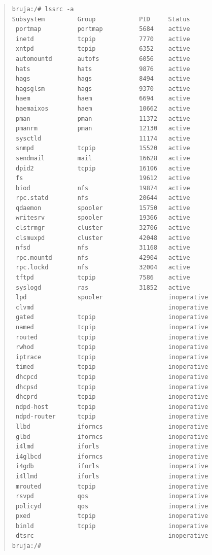 \begin{quote}
\begin{verbatim}
bruja:/# lssrc -a
Subsystem         Group            PID     Status 
 portmap          portmap          5684    active
 inetd            tcpip            7770    active
 xntpd            tcpip            6352    active
 automountd       autofs           6056    active
 hats             hats             9876    active
 hags             hags             8494    active
 hagsglsm         hags             9370    active
 haem             haem             6694    active
 haemaixos        haem             10662   active
 pman             pman             11372   active
 pmanrm           pman             12130   active
 sysctld                           11174   active
 snmpd            tcpip            15520   active
 sendmail         mail             16628   active
 dpid2            tcpip            16106   active
 fs                                19612   active
 biod             nfs              19874   active
 rpc.statd        nfs              20644   active
 qdaemon          spooler          15750   active
 writesrv         spooler          19366   active
 clstrmgr         cluster          32706   active
 clsmuxpd         cluster          42048   active
 nfsd             nfs              31168   active
 rpc.mountd       nfs              42904   active
 rpc.lockd        nfs              32004   active
 tftpd            tcpip            7586    active
 syslogd          ras              31852   active
 lpd              spooler                  inoperative
 clvmd                                     inoperative
 gated            tcpip                    inoperative
 named            tcpip                    inoperative
 routed           tcpip                    inoperative
 rwhod            tcpip                    inoperative
 iptrace          tcpip                    inoperative
 timed            tcpip                    inoperative
 dhcpcd           tcpip                    inoperative
 dhcpsd           tcpip                    inoperative
 dhcprd           tcpip                    inoperative
 ndpd-host        tcpip                    inoperative
 ndpd-router      tcpip                    inoperative
 llbd             iforncs                  inoperative
 glbd             iforncs                  inoperative
 i4lmd            iforls                   inoperative
 i4glbcd          iforncs                  inoperative
 i4gdb            iforls                   inoperative
 i4llmd           iforls                   inoperative
 mrouted          tcpip                    inoperative
 rsvpd            qos                      inoperative
 policyd          qos                      inoperative
 pxed             tcpip                    inoperative
 binld            tcpip                    inoperative
 dtsrc                                     inoperative
bruja:/# 
\end{verbatim}
\end{quote}
